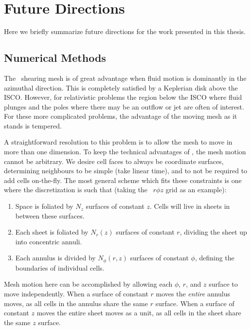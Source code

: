 \renewcommand{\chapid}{future}



\chapter{Future Directions }

Here we briefly summarize future directions for the work presented in this thesis.

\section{Numerical Methods}

The \disco\ shearing mesh is of great advantage when fluid motion is dominantly in the azimuthal direction.  This is completely satisfied by a Keplerian disk above the ISCO.  However, for relativistic problems the region below the ISCO where fluid plunges and the poles where there may be an outflow or jet are often of interest.  For these more complicated problems, the advantage of the moving mesh as it stands is tempered.

A straightforward resolution to this problem is to allow the mesh to move in more than one dimension.  To keep the technical advantages of \disco, the mesh motion cannot be arbitrary.  We desire cell faces to always be coordinate surfaces, determining neighbours to be simple (take linear time), and to not be required to add cells on-the-fly.  The most general scheme which fits these constraints is one where the discretization is such that (taking the \disco\ $r\phi z$ grid as an example):
\begin{enumerate}
	\item Space is foliated by $N_z$ surfaces of constant $z$.  Cells will live in sheets in between these surfaces.
	\item Each sheet is foliated by $N_r(z)$ surfaces of constant $r$, dividing the sheet up into concentric annuli.
	\item Each annulus is divided by $N_\phi(r,z)$ surfaces of constant $\phi$, defining the boundaries of individual cells.
\end{enumerate}
Mesh motion here can be accomplished by allowing each $\phi$, $r$, and $z$ surface to move independently.  When a surface of constant $r$ moves the \emph{entire} annulus moves, as all cells in the annulus share the same $r$ surface.  When a surface of constant $z$ moves the entire sheet moves as a unit, as all cells in the sheet share the same $z$ surface.

